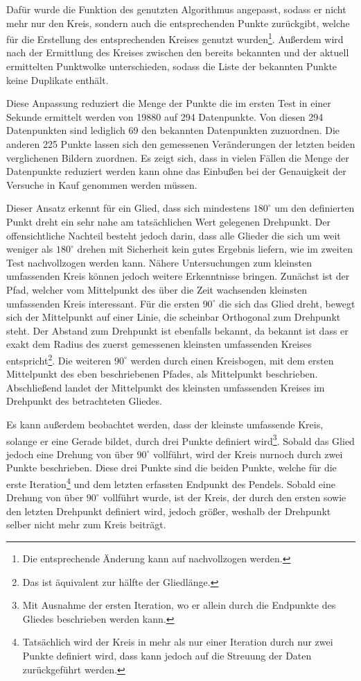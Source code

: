 Dafür wurde die Funktion des genutzten Algorithmus angepasst, sodass er nicht mehr nur den Kreis, sondern auch die entsprechenden Punkte zurückgibt, welche für die Erstellung des entsprechenden Kreises genutzt wurden\footnote{Die entsprechende Änderung kann auf  nachvollzogen werden.}.
Au{\ss}erdem wird nach der Ermittlung des Kreises zwischen den bereits bekannten und der aktuell ermittelten Punktwolke unterschieden, sodass die Liste der bekannten Punkte keine Duplikate enthält.

Diese Anpassung reduziert die Menge der Punkte die im ersten Test in einer Sekunde ermittelt werden von 19880 auf 294 Datenpunkte.
Von diesen 294 Datenpunkten sind lediglich 69 den bekannten Datenpunkten zuzuordnen.
Die anderen 225 Punkte lassen sich den gemessenen Veränderungen der letzten beiden verglichenen Bildern zuordnen.
Es zeigt sich, dass in vielen Fällen die Menge der Datenpunkte reduziert werden kann ohne das Einbu{\ss}en bei der Genauigkeit der Versuche in Kauf genommen werden müssen.

Dieser Ansatz erkennt für ein Glied, dass sich mindestens $180^\circ$ um den definierten Punkt dreht ein sehr nahe am tatsächlichen Wert gelegenen Drehpunkt.
Der offensichtliche Nachteil besteht jedoch darin, dass alle Glieder die sich um weit weniger als $180^\circ$ drehen mit Sicherheit kein gutes Ergebnis liefern, wie im zweiten Test nachvollzogen werden kann.
Nähere Untersuchungen zum kleinsten umfassenden Kreis können jedoch weitere Erkenntnisse bringen.
Zunächst ist der Pfad, welcher vom Mittelpunkt des über die Zeit wachsenden kleinsten umfassenden Kreis interessant.
Für die ersten $90^\circ$ die sich das Glied dreht, bewegt sich der Mittelpunkt auf einer Linie, die scheinbar Orthogonal zum Drehpunkt steht.
Der Abstand zum Drehpunkt ist ebenfalls bekannt, da bekannt ist dass er exakt dem Radius des zuerst gemessenen kleinsten umfassenden Kreises entspricht\footnote{Das ist äquivalent zur hälfte der Gliedlänge.}.
Die weiteren $90^\circ$ werden durch einen Kreisbogen, mit dem ersten Mittelpunkt des eben beschriebenen Pfades, als Mittelpunkt beschrieben.
Abschlie{\ss}end landet der Mittelpunkt des kleinsten umfassenden Kreises im Drehpunkt des betrachteten Gliedes.

Es kann au{\ss}erdem beobachtet werden, dass der kleinste umfassende Kreis, solange er eine Gerade bildet, durch drei Punkte definiert wird\footnote{Mit Ausnahme der ersten Iteration, wo er allein durch die Endpunkte des Gliedes beschrieben werden kann.}.
Sobald das Glied jedoch eine Drehung von über $90^\circ$ vollführt, wird der Kreis nurnoch durch zwei Punkte beschrieben.
Diese drei Punkte sind die beiden Punkte, welche für die erste Iteration\footnote{Tatsächlich wird der Kreis in mehr als nur einer Iteration durch nur zwei Punkte definiert wird, dass kann jedoch auf die Streuung der Daten zurückgeführt werden.} und dem letzten erfassten Endpunkt des Pendels.
Sobald eine Drehung von über $90^\circ$ vollführt wurde, ist der Kreis, der durch den ersten sowie den letzten Drehpunkt definiert wird, jedoch grö{\ss}er, weshalb der Drehpunkt selber nicht mehr zum Kreis beiträgt.

